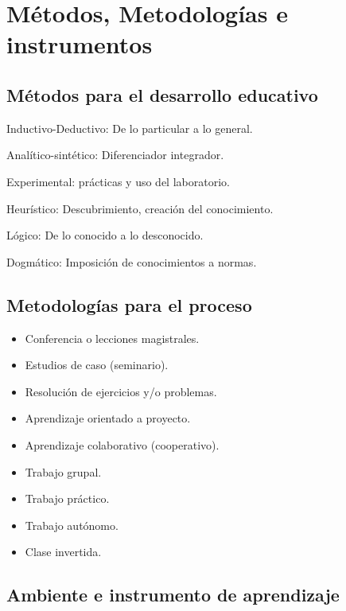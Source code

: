 \documentclass[a4paper,12pt,spanish]{article}
\newcommand{\cmark}{\ding{51}}%
\newcommand{\done}{\rlap{$\square$}{\raisebox{2pt}{\large\hspace{1pt}\cmark}}%
\hspace{-2.5pt}}
\begin{document}
\section{Métodos, Metodologías e instrumentos}
\label{sec:metod-metod-e}

\subsection{Métodos para el desarrollo educativo}
\label{sec:metodos-para-el}

\begin{todolist}
\item  [\done] Inductivo-Deductivo: De lo particular a lo general.
\item [\done] Analítico-sintético: Diferenciador integrador.
\item [\done] Experimental: prácticas y uso del laboratorio.
\item [\done] Heurístico: Descubrimiento, creación del conocimiento.
\item [\done] Lógico: De lo conocido a lo desconocido.
\item [\done] Dogmático: Imposición de conocimientos a normas.
\end{todolist}

\subsection{Metodologías para el proceso}
\label{sec:metodologias-para-el}

\begin{itemize}
\item [\done] Conferencia o lecciones magistrales.
\item [\done] Estudios de caso (seminario).
\item [\done] Resolución de ejercicios y/o problemas.
\item [\done] Aprendizaje orientado a proyecto.
\item [\done] Aprendizaje colaborativo (cooperativo).
\item [\done] Trabajo grupal.
\item [\done] Trabajo práctico.
\item [\done] Trabajo autónomo.
\item [\done] Clase invertida.

\end{itemize}

\subsection{Ambiente e instrumento de aprendizaje}
\label{sec:ambi-e-instr}
\end{document}
